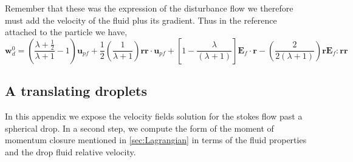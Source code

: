 Remember that these was the expression of the disturbance flow we therefore must add the velocity of the fluid plus its gradient. 
Thus in the reference attached to the particle we have, 
\begin{equation*}
    \textbf{w}_d^0 
    = \left(\frac{\lambda + \frac{1}{2}}{\lambda +1} - 1\right)
    \textbf{u}_{pf} 
    + 
    \frac{1}{2}\left(\frac{1}{\lambda +1}\right)
    \textbf{rr} \cdot \textbf{u}_{pf} 
    + \left[1-\frac{\lambda}{(\lambda + 1)}\right]\textbf{E}_f\cdot\textbf{r}
    -\left(\frac{2}{2(\lambda +1 )} \right) \textbf{r} \textbf{E}_f:\textbf{rr}
\end{equation*}


\subsection*{A translating droplets}
\label{ap:Translating_sphere}





In this appendix we expose the velocity fields solution for the stokes flow past a spherical drop. 
In a second step, we compute the form of the moment of momentum closure mentioned in \ref{sec:Lagrangian} in terms of the fluid properties and the drop fluid relative velocity.

